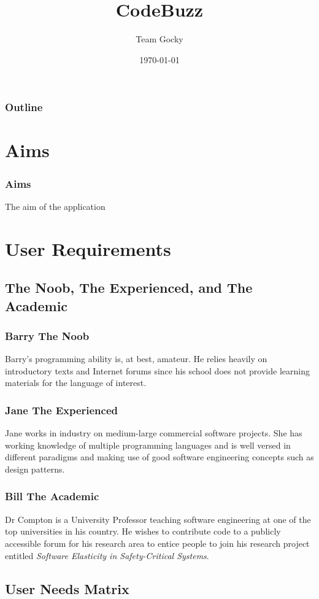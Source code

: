 \documentclass{beamer}
\title[DIM3 Project Presentation]{CodeBuzz}
\author{Team Gocky}
\institute{University Of Glasgow}
\date{\today}
\begin{document}
\begin{frame}
\titlepage
\end{frame}

\begin{frame}
\frametitle{Outline}
\tableofcontents[pausesections]
\end{frame}

\section{Aims}

\begin{frame}
\frametitle{Aims}
The aim of the application
\end{frame}

\section{User Requirements}

\subsection{The Noob, The Experienced, and The Academic}

\begin{frame}
\frametitle{Barry The Noob}
Barry's programming ability is, at best,
amateur. He relies heavily on introductory texts and Internet forums
since his school does not provide learning materials for the language
of interest.
\end{frame}

\begin{frame}
\frametitle{Jane The Experienced}
Jane works in industry on medium-large commercial software projects. She has 
working knowledge of multiple programming languages and is well versed in 
different paradigms and making use of good software engineering concepts such as 
design patterns.
\end{frame}

\begin{frame}
\frametitle{Bill The Academic}
Dr Compton is a University Professor teaching software engineering at
one of the top universities in his country. He wishes to contribute
code to a publicly accessible forum for his research area to entice
people to join his research project entitled
\textit{Software Elasticity in Safety-Critical Systems}.
\end{frame}

\subsection{User Needs Matrix}
\end{document}
